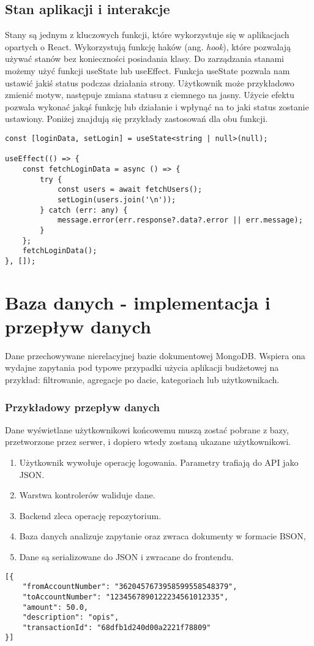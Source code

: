 \subsection*{Stan aplikacji i interakcje}
Stany są jednym z kluczowych funkcji, które wykorzystuje się w aplikacjach opartych o React. Wykorzystują funkcję haków (ang. \textit{hook}), które pozwalają używać stanów bez konieczności posiadania klasy. Do zarządzania stanami możemy użyć funkcji useState lub useEffect. Funkcja useState pozwala nam ustawić jakiś status podczas działania strony. Użytkownik może przykładowo zmienić motyw, następuje zmiana statusu z ciemnego na jasny. Użycie efektu pozwala wykonać jakąś funkcję lub działanie i wpłynąć na to jaki status zostanie ustawiony. Poniżej znajdują się przykłady zastosowań dla obu funkcji.
\begin{lstlisting}[caption={Wykorzystanie stanów}, label={lst:TS-states}]
const [loginData, setLogin] = useState<string | null>(null);
	
useEffect(() => {
	const fetchLoginData = async () => {
		try {
			const users = await fetchUsers();
			setLogin(users.join('\n'));
		} catch (err: any) {
			message.error(err.response?.data?.error || err.message);
		}
	};
	fetchLoginData();
}, []);
\end{lstlisting}
\section{Baza danych - implementacja i przepływ danych}
Dane przechowywane nierelacyjnej bazie dokumentowej MongoDB. Wspiera ona wydajne zapytania pod typowe przypadki użycia aplikacji budżetowej na przykład: filtrowanie, agregacje po dacie, kategoriach lub użytkownikach. 
\subsubsection*{Przykładowy przepływ danych}
Dane wyświetlane użytkownikowi końcowemu muszą zostać pobrane z bazy, przetworzone przez serwer, i dopiero wtedy zostaną ukazane użytkownikowi. 
\begin{enumerate}
	\item Użytkownik wywołuje operację logowania. Parametry trafiają do API jako JSON.
	\item Warstwa kontrolerów waliduje dane. 
	\item Backend zleca operację repozytorium.
	\item Baza danych analizuje zapytanie oraz zwraca dokumenty w formacie BSON,
	\item Dane są serializowane do JSON i zwracane do frontendu.
\end{enumerate}
\begin{lstlisting}[caption={Przykładowe dane zwracane z bazy}, label={lst:TS-service1}]
[{
	"fromAccountNumber": "3620457673958599558548379",
	"toAccountNumber": "1234567890122234561012335",
	"amount": 50.0,
	"description": "opis",
	"transactionId": "68dfb1d240d00a2221f78809"
}]
\end{lstlisting}
